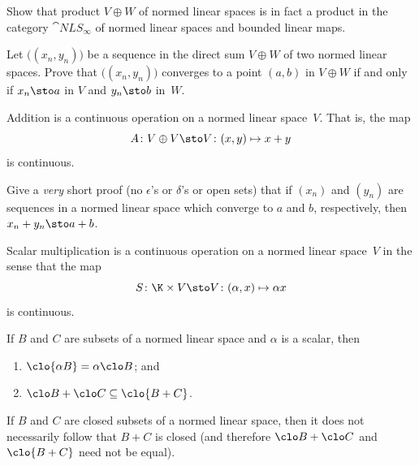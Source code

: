 \begin{exam}\label{exam_prod_nls} Show that product $V \oplus W$ of normed linear spaces is in fact a product
in the category $\cat{NLS_{\boldsymbol\infty}}$  of normed linear spaces and bounded
linear maps.
\end{exam}

\begin{prop} Let $\bigl((x_n,y_n)\bigr)$ be a sequence in the direct sum $V \oplus W$ of two normed linear
spaces. Prove that $\bigl((x_n,y_n)\bigr)$ converges to a point $(a,b)$ in $V \oplus W$ if and only
if $x_n \sto a$ in $V$ and $y_n \sto b$ in~$W$.
\end{prop}

\begin{prop}\label{C023427} Addition is a continuous operation on a normed linear space~$V$.
That is, the map
   \[ A \colon V \oplus V \sto V \colon (x,y) \mapsto x + y \]
is continuous.
\end{prop}

\begin{exer} Give a \emph{very} short proof (no $\epsilon$'s or $\delta$'s or open sets) that if
$(x_n)$ and $(y_n)$ are sequences in a normed linear space which converge to $a$ and $b$,
respectively, then $x_n + y_n \sto a + b$.
\end{exer}

\begin{prop}\label{C023434} Scalar multiplication is a continuous operation on a normed
linear space~$V$ in the sense that the map
   \[ S \colon \K \times V \sto V \colon  (\alpha,x) \mapsto \alpha x \]
is continuous.
\end{prop}

\begin{prop} If $B$ and $C$ are subsets of a normed linear space and $\alpha$ is a scalar, then
 \begin{enumerate}
   \item $\clo{\alpha B} = \alpha \clo B$; and
   \item $\clo B + \clo C  \subseteq  \clo{B + C}$.
 \end{enumerate}
\end{prop}

\begin{exam} If $B$ and $C$ are closed subsets of a normed linear space, then it does not
necessarily follow that $B + C$ is closed (and therefore $\clo B + \clo C$ and $\clo{B +
C}$ need not be equal).
\end{exam}

